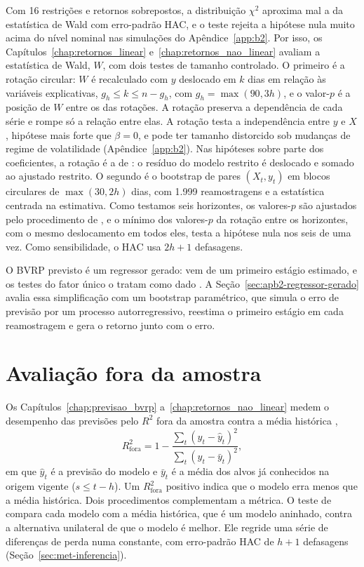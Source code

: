 Com 16 restrições e retornos sobrepostos, a distribuição $\chi^2$ aproxima mal
a da estatística de Wald com erro-padrão HAC, e o teste rejeita a hipótese
nula muito acima do nível nominal nas simulações do Apêndice~\ref{app:b2}. Por
isso, os Capítulos~\ref{chap:retornos_linear} e~\ref{chap:retornos_nao_linear}
avaliam a estatística de Wald, $W$, com dois testes de tamanho controlado. O
primeiro é a rotação circular: $W$ é recalculado com $y$ deslocado em $k$ dias
em relação às variáveis explicativas, $g_h \le k \le n - g_h$, com
$g_h = \max(90, 3h)$, e o valor-$p$ é a posição de $W$ entre os das rotações.
A rotação preserva a dependência de cada série e rompe só a relação entre
elas. A rotação testa a independência entre $y$ e $X$, hipótese mais forte que
$\beta = 0$, e pode ter tamanho distorcido sob mudanças de regime de
volatilidade (Apêndice~\ref{app:b2}). Nas hipóteses sobre parte dos
coeficientes, a rotação é a de \citet{freedman1983nonstochastic}: o resíduo do
modelo restrito é deslocado e somado ao ajustado restrito. O segundo é o
bootstrap de pares $(X_t, y_t)$ em blocos circulares \citep{politis1992circular}
de $\max(30, 2h)$ dias, com 1.999 reamostragens e a estatística centrada na
estimativa. Como testamos seis horizontes, os valores-$p$ são
ajustados pelo procedimento de \citet{holm1979simple}, e o mínimo dos
valores-$p$ da rotação entre os horizontes, com o mesmo deslocamento em todos
eles, testa a hipótese nula nos seis de uma vez. Como sensibilidade, o HAC usa
$2h+1$ defasagens.

O BVRP previsto é um regressor gerado: vem de um primeiro estágio estimado, e
os testes do fator único o tratam como dado \citep{pagan1984}. A
Seção~\ref{sec:apb2-regressor-gerado} avalia essa simplificação com um
bootstrap paramétrico, que simula o erro de previsão por um processo
autorregressivo, reestima o primeiro estágio em cada reamostragem e gera o
retorno junto com o erro.

\section{Avaliação fora da amostra}
\label{sec:met-avaliacao}

Os Capítulos~\ref{chap:previsao_bvrp} a~\ref{chap:retornos_nao_linear} medem o desempenho das previsões pelo $R^2$
fora da amostra contra a média histórica \citep{campbell2008predicting},
\[
R^2_{\text{fora}} = 1 - \frac{\sum_t (y_t - \hat{y}_t)^2}{\sum_t (y_t - \bar{y}_t)^2},
\]
em que $\hat{y}_t$ é a previsão do modelo e $\bar{y}_t$ é a média dos alvos já
conhecidos na origem vigente ($s \le t - h$). Um $R^2_{\text{fora}}$ positivo
indica que o modelo erra menos que a média histórica. Dois procedimentos
complementam a métrica. O teste de \citet{clark2007approximately} compara cada
modelo com a média histórica, que é um modelo aninhado, contra a alternativa
unilateral de que o modelo é melhor. Ele regride uma série de diferenças de
perda numa constante, com erro-padrão HAC de $h+1$ defasagens
(Seção~\ref{sec:met-inferencia}).


